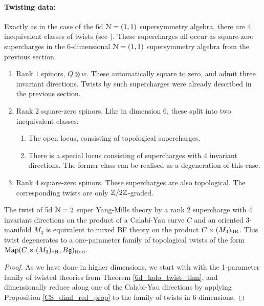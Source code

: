 \documentclass[10pt, oneside]{article}
\begin{document}
\paragraph{Twisting data:}
Exactly as in the case of the 6d $\mathcal{N}=(1,1)$ supersymmetry algebra, there are 4 inequivalent classes of twists (see \cite[Section 4.5]{ElliottSafronov}).  These supercharges all occur as square-zero supercharges in the 6-dimensional $\mathcal{N}=(1,1)$ supersymmetry algebra from the previous section.
\begin{enumerate}
 \item Rank $1$ spinors, $Q \otimes w$.  These automatically square to zero, and admit three invariant directions.  Twists by such supercharges were already described in the previous section.
 \item Rank $2$ square-zero spinors.  Like in dimension 6, these split into two inequivalent classes:
 \begin{enumerate}
 \item The open locus, consisting of topological supercharges.
 \item There is a special locus consisting of supercharges with 4 invariant directions.  The former class can be realised as a degeneration of this case.
 \end{enumerate}
 \item Rank $4$ square-zero spinors.  These supercharges are also topological.  The corresponding twists are only $\mathbb Z/2\mathbb Z$-graded.
\end{enumerate}

\begin{theorem} \label{5d_rk2_twist_thm}
The twist of 5d $\mathcal{N}=2$ super Yang-Mills theory by a rank $2$ supercharge with 4 invariant directions on the product of a Calabi-Yau curve $C$ and an oriented 3-manifold $M_3$ is equivalent to mixed BF theory on the product $C \times (M_3)_{\mathrm{dR}}$. This twist degenerates to a one-parameter family of topological twists of the form $\operatorname{Map}(C \times (M_3)_{\mathrm{dR}}, B\mathfrak{g})_{\mathrm{Hod}}$.
\end{theorem}

\begin{proof}
As we have done in higher dimensions, we start with with the 1-parameter family of twisted theories from Theorem \ref{6d_holo_twist_thm}, and dimensionally reduce along one of the Calabi-Yau directions by applying Proposition \ref{CS_diml_red_prop} to the family of twists in 6-dimensions.
\end{proof}
\end{document}
